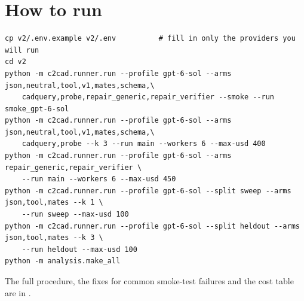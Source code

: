 \documentclass[10pt,a4paper]{article}
\newcommand{\file}[1]{\path{#1}}
\begin{document}
\section{How to run}
\begin{small}
\begin{verbatim}
cp v2/.env.example v2/.env          # fill in only the providers you will run
cd v2
python -m c2cad.runner.run --profile gpt-6-sol --arms json,neutral,tool,v1,mates,schema,\
    cadquery,probe,repair_generic,repair_verifier --smoke --run smoke_gpt-6-sol
python -m c2cad.runner.run --profile gpt-6-sol --arms json,neutral,tool,v1,mates,schema,\
    cadquery,probe --k 3 --run main --workers 6 --max-usd 400
python -m c2cad.runner.run --profile gpt-6-sol --arms repair_generic,repair_verifier \
    --run main --workers 6 --max-usd 450
python -m c2cad.runner.run --profile gpt-6-sol --split sweep --arms json,tool,mates --k 1 \
    --run sweep --max-usd 100
python -m c2cad.runner.run --profile gpt-6-sol --split heldout --arms json,tool,mates --k 3 \
    --run heldout --max-usd 100
python -m analysis.make_all
\end{verbatim}
\end{small}
The full procedure, the fixes for common smoke-test failures and the cost table are in \file{v2/RUNBOOK.md}.

\end{document}
